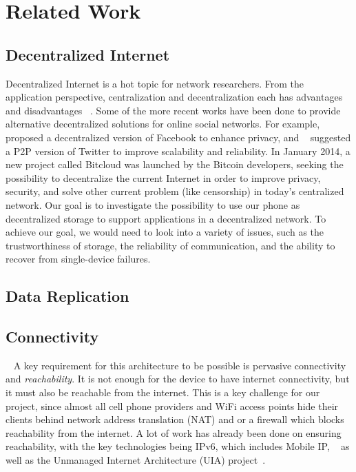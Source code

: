 \section{Related Work}
\label{Related Work}

\subsection{Decentralized Internet}
Decentralized Internet is a hot topic for network researchers. From the application perspective, centralization and decentralization each has advantages and disadvantages ~\cite{schuff2001}. 
Some of the more recent works have been done to provide alternative decentralized solutions for online social networks. 
For example, ~\cite{persona} proposed a decentralized version of Facebook to enhance privacy, and ~\cite{xu2010} suggested a P2P version of Twitter to improve scalability and reliability. 
In January 2014, a new project called Bitcloud was launched by the Bitcoin developers, seeking the possibility to decentralize the current Internet in order to improve privacy, security, and solve other current problem (like censorship) in today's centralized network.
Our goal is to investigate the possibility to use our phone as decentralized storage to support applications in a decentralized network. 
To achieve our goal, we would need to look into a variety of issues, such as the trustworthiness of storage, the reliability of communication, and the ability to recover from single-device failures.

\subsection{Data Replication}


\subsection{Connectivity}~\label{sec:relconn}
A key requirement for this architecture to be possible is pervasive connectivity and \emph{reachability}.
It is not enough for the device to have internet connectivity, but it must also be reachable from the internet.
This is a key challenge for our project, since almost all cell phone providers and WiFi access points hide their clients behind network address translation (NAT) and or a firewall which blocks reachability from the internet.
A lot of work has already been done on ensuring reachability, with the key technologies being IPv6, which includes Mobile IP, ~\cite{deering1998internet} as well as the Unmanaged Internet Architecture (UIA) project~\cite{ford2008uia, ford2006persistent}.


